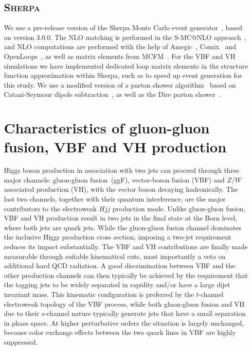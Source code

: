 \documentclass[10pt,prd,fleqn,superscriptaddress,notitlepage,nofootinbib,preprintnumbers,nobalancelastpage]{revtex4-1}
\newcommand{\Sherpa}{\textsc{Sherpa}\xspace}
\newcommand{\VBF}{VBF\xspace}
\newcommand{\VH}{VH\xspace}
\begin{document}
\subsection{\Sherpa}
We use a pre-release version of the Sherpa Monte
Carlo event generator~\cite{Gleisberg:2003xi,Gleisberg:2008ta,Bothmann:2019yzt},
based on version 3.0.0. The NLO matching is performed in the S-MC@NLO
approach~\cite{Hoeche:2011fd,Hoeche:2012ft}, and NLO computations are performed with
the help of Amegic~\cite{Krauss:2001iv,Gleisberg:2007md}, Comix~\cite{Gleisberg:2008fv}
and OpenLoops~\cite{Cascioli:2011va,Buccioni:2019sur}, as well as matrix elements from MCFM~\cite{Campbell:2019dru}.
For the \VBF and \VH simulations we have implemented dedicated loop matrix elements
in the structure function approximation within Sherpa,
such as to speed up event generation for this study.
We use a modified version of a parton shower algorithm~\cite{Schumann:2007mg}
based on Catani-Seymour dipole subtraction~\cite{Catani:1996vz,Catani:2002hc},
as well as the Dire parton shower~\cite{Hoche:2015sya}.


\section{Characteristics of gluon-gluon fusion,  \VBF and \VH production}
\label{sec:characteristics}
Higgs boson production in association with two jets can proceed through three major channels: gluon-gluon fusion~(ggF), vector-boson fusion (\VBF) and
$Z$/$W$ associated production (\VH), with the vector boson decaying hadronically.
The last two channels, together with their quantum interference, are the major contributors to the electroweak $Hjj$ production mode.
Unlike gluon-gluon fusion, \VBF and \VH production result in two jets in the final state at the Born level, where both jets are quark jets.
While the gluon-gluon fusion channel dominates the inclusive Higgs production cross section, imposing a two-jet requirement reduces its impact substantially.
The \VBF and \VH contributions are finally made measurable through suitable kinematical cuts, most importantly a veto on additional hard QCD radiation.
A good discrimination between \VBF and the other production channels can then typically be achieved by the requirement that the tagging jets to
be widely separated in rapidity and/or have a large dijet invariant mass. This kinematic configuration is preferred by the $t$-channel electroweak
topology of the VBF process, while both gluon-gluon fusion and \VH due to their $s$-channel nature typically generate jets that have a small separation
in phase space. At higher perturbative orders the situation is largely unchanged, because color exchange effects between the two quark lines
in \VBF are highly suppressed.
\end{document}
